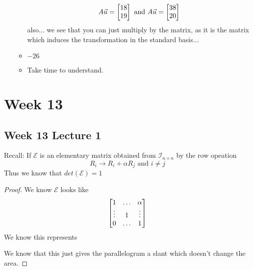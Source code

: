 \documentclass[11pt]{book}
\begin{document}
\begin{itemize}
\begin{itemize}
                \[
                A\vec{u} = \mat{ 18 \\ 19 } \text{ and } A\vec{u} = \mat{ 38 \\ 20 } 
                \]
                also... we see that you can just multiply by the matrix, as it is the matrix which induces the transformation in the standard basis...
            \item $-26$ 
            \item Take time to understand.
        \end{itemize}
\end{itemize}





\chapter{Week 13}%
\label{chp:week_13}

\section{Week 13 Lecture 1}%
\label{sec:week_13_lecture_1}




Recall:
If $\mathcal{E} $ is an elementary matrix obtained from $\mathcal{I} _{n\times n} $ by the row opeation 
\[
R_{i} \to R_{i}  + \alpha R_{j} \text{ and } i \neq j
\]
Thus we know that $\mathit{det} \left(\mathcal{E} \right) = 1$ 

\begin{proof}
    We know $\mathcal{E} $ looks like 
    \[
    \mat[b]{ 1 & \ldots  & \alpha  \\ \vdots   & 1 & \vdots  \\ 0 & \ldots  & 1 }
    \]
    We know this represents
    \begin{center}
    \end{center}
We know that this just gives the parallelogram a slant which doesn't change the area.
\end{proof}
\end{document}

